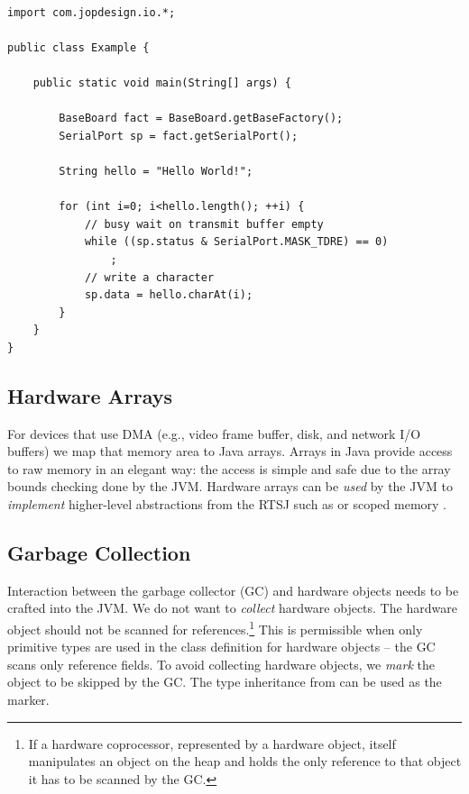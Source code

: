 \begin{lstlisting}[float=t,caption={A `Hello World' example with low-level device
access via a hardware object},
label=lst:hwo:hello:world]

import com.jopdesign.io.*;

public class Example {

    public static void main(String[] args) {

        BaseBoard fact = BaseBoard.getBaseFactory();
        SerialPort sp = fact.getSerialPort();

        String hello = "Hello World!";

        for (int i=0; i<hello.length(); ++i) {
            // busy wait on transmit buffer empty
            while ((sp.status & SerialPort.MASK_TDRE) == 0)
                ;
            // write a character
            sp.data = hello.charAt(i);
        }
    }
}
\end{lstlisting}


\subsection{Hardware Arrays}

For devices that use DMA (e.g., video frame buffer, disk, and network
I/O buffers) we map that memory area to Java arrays. Arrays in Java
provide access to raw memory in an elegant way: the access is simple
and safe due to the array bounds checking done by the JVM. Hardware
arrays can be \emph{used} by the JVM to \emph{implement} higher-level
abstractions from the RTSJ such as  or scoped memory
\cite{jop:scope:cache}.

\subsection{Garbage Collection}

Interaction between the garbage collector (GC) and hardware objects
needs to be crafted into the JVM. We do not want to \emph{collect}
hardware objects. The hardware object should not be scanned for
references.\footnote{If a hardware coprocessor, represented by a
hardware object, itself manipulates an object on the heap and holds
the only reference to that object it has to be scanned by the GC.}
This is permissible when only primitive types are used in the class
definition for hardware objects -- the GC scans only reference
fields. To avoid collecting hardware objects, we \emph{mark} the
object to be skipped by the GC. The type inheritance from
 can be used as the marker.

